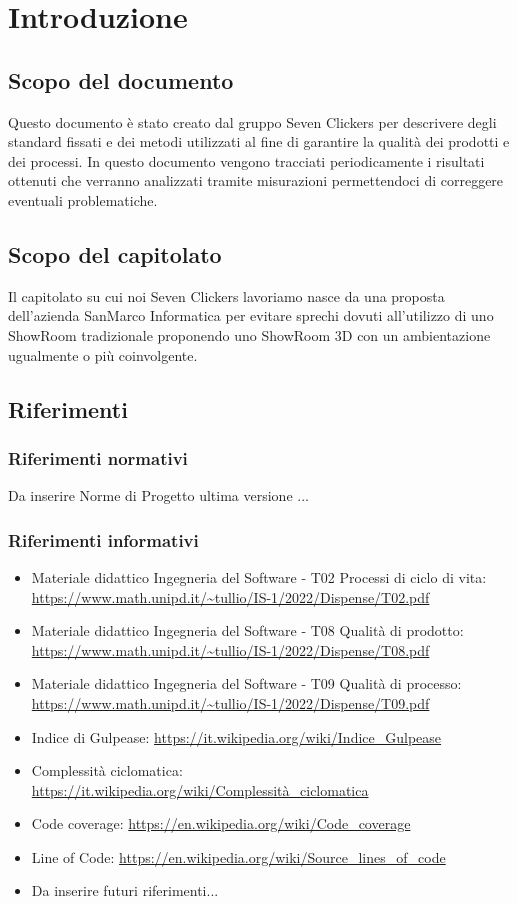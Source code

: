 \section{Introduzione}
\subsection{Scopo del documento}
Questo documento è stato creato dal gruppo Seven Clickers per descrivere degli standard fissati e dei metodi utilizzati al fine di garantire la qualità dei prodotti e dei processi.
In questo documento vengono tracciati periodicamente i risultati ottenuti che verranno analizzati tramite misurazioni permettendoci di correggere eventuali problematiche.

\subsection{Scopo del capitolato}
Il capitolato su cui noi Seven Clickers lavoriamo nasce da una proposta dell'azienda SanMarco Informatica per evitare sprechi dovuti all'utilizzo di uno ShowRoom tradizionale proponendo uno ShowRoom 3D con un ambientazione ugualmente o più coinvolgente.

\subsection{Riferimenti}
\subsubsection{Riferimenti normativi}
Da inserire Norme di Progetto ultima versione ...

\subsubsection{Riferimenti informativi}
\begin{itemize}
	\item Materiale didattico Ingegneria del Software - T02 Processi di ciclo di vita: \url{https://www.math.unipd.it/~tullio/IS-1/2022/Dispense/T02.pdf}
	\item Materiale didattico Ingegneria del Software - T08 Qualità di prodotto: \url{https://www.math.unipd.it/~tullio/IS-1/2022/Dispense/T08.pdf}
	\item Materiale didattico Ingegneria del Software - T09 Qualità di processo: \url{https://www.math.unipd.it/~tullio/IS-1/2022/Dispense/T09.pdf}
	\item Indice di Gulpease: \url{https://it.wikipedia.org/wiki/Indice_Gulpease}
	\item Complessità ciclomatica: \url{https://it.wikipedia.org/wiki/Complessità_ciclomatica}
	\item Code coverage: \url{https://en.wikipedia.org/wiki/Code_coverage}
	\item Line of Code: \url{https://en.wikipedia.org/wiki/Source_lines_of_code}	
	\item Da inserire futuri riferimenti...
\end{itemize}

